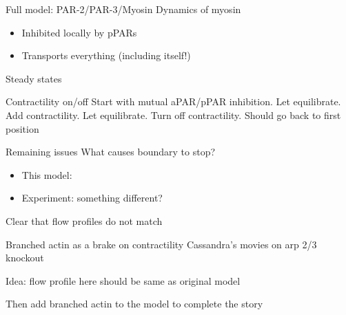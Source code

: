 \documentclass{beamer}
\newcommand{\6}[1]{#1_{\text{6}}}
\newcommand{\3}[1]{#1_{\text{3}}}
\begin{document}
\begin{frame}{Full model: PAR-2/PAR-3/Myosin}
Dynamics of myosin
\begin{itemize}
\item Inhibited locally by pPARs
\item Transports everything (including itself!)
\end{itemize}
\end{frame}

\begin{frame}{Steady states}
\end{frame}

\begin{frame}{Contractility on/off}
Start with mutual aPAR/pPAR inhibition. Let equilibrate. Add contractility. Let equilibrate. Turn off contractility. Should go back to first position
\end{frame}

\begin{frame}{Remaining issues}
What causes boundary to stop?
\begin{itemize}
\item This model: 
\item Experiment: something different?
\end{itemize}
Clear that flow profiles do not match
\end{frame}

\begin{frame}{Branched actin as a brake on contractility}
Cassandra's movies on arp 2/3 knockout

Idea: flow profile here should be same as original model

Then add branched actin to the model to complete the story

\end{frame}



\iffalse
\begin{frame}{Computational rheology in dynamic cross-linked networks}
\centering
\movie[width=0.48\textwidth]{
 \texttt{[image: RelaxationTurnover5\_478.png]}
}{ShearTurnover5.mp4}
\movie[width=0.48\textwidth]{
 \texttt{[image: RelaxationTurnover10\_478.png]}
}{ShearTurnover10.mp4}
\newline \phantom{x} \qquad $\tau_f/\tau_c \approx 0.3$ \qquad \qquad \qquad \qquad \quad $\tau_f/\tau_c \approx 0.7$ 
\newline ``Meshwork'' \qquad \qquad \qquad \qquad \quad ``B-In-M''
\end{frame}
\fi
\end{document}
